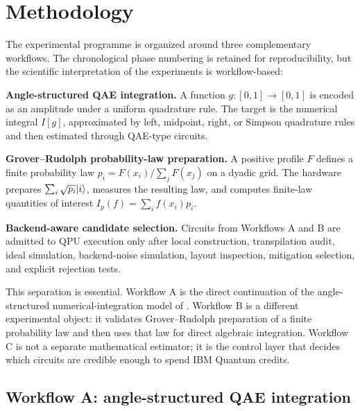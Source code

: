 \section{Methodology}
\label{sec:methodology}

The experimental programme is organized around three complementary workflows.
The chronological phase numbering is retained for reproducibility, but the
scientific interpretation of the experiments is workflow-based:
\begin{description}[leftmargin=!,labelwidth=4.8cm]
  \item[Workflow A.]
        \textbf{Angle-structured QAE integration.}
        A function \(g:[0,1]\to[0,1]\) is encoded as an amplitude under a
        uniform quadrature rule. The target is the numerical integral
        \(I[g]\), approximated by left, midpoint, right, or Simpson quadrature
        rules and then estimated through QAE-type circuits.
  \item[Workflow B.]
        \textbf{Grover--Rudolph probability-law preparation.}
        A positive profile \(F\) defines a finite probability law
        \(p_i=F(x_i)/\sum_jF(x_j)\) on a dyadic grid. The hardware prepares
        \(\sum_i\sqrt{p_i}\lvert i\rangle\), measures the resulting law, and computes
        finite-law quantities of interest
        \(I_p(f)=\sum_i f(x_i)p_i\).
  \item[Workflow C.]
        \textbf{Backend-aware candidate selection.}
        Circuits from Workflows A and B are admitted to QPU execution only
        after local construction, transpilation audit, ideal simulation,
        backend-noise simulation, layout inspection, mitigation selection, and
        explicit rejection tests.
\end{description}

This separation is essential. Workflow A is the direct continuation of the
angle-structured numerical-integration model of
\cite{chinesta2026encoding}. Workflow B is a different experimental object:
it validates Grover--Rudolph preparation of a finite probability law and then
uses that law for direct algebraic integration. Workflow C is not a separate
mathematical estimator; it is the control layer that decides which circuits are
credible enough to spend IBM Quantum credits.

\subsection{Workflow A: angle-structured QAE integration}
\label{subsec:workflow-a}

